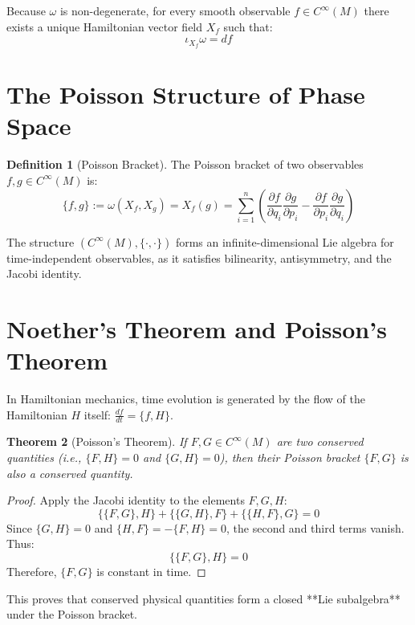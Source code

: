\documentclass[11pt,a4paper,oneside]{book}
\theoremstyle{definition}
\newtheorem{definition}{Definition}[chapter]
\theoremstyle{plain}
\newtheorem{theorem}[definition]{Theorem}
\begin{document}
Because $\omega$ is non-degenerate, for every smooth observable $f \in C^\infty(M)$ there exists a unique Hamiltonian vector field $X_f$ such that:
\begin{equation}
\iota_{X_f} \omega = d f
\end{equation}

\section{The Poisson Structure of Phase Space}
\begin{definition}[Poisson Bracket]
The Poisson bracket of two observables $f, g \in C^\infty(M)$ is:
\begin{equation}
\{f, g\} := \omega(X_f, X_g) = X_f(g) = \sum_{i=1}^n \left( \frac{\partial f}{\partial q_i} \frac{\partial g}{\partial p_i} - \frac{\partial f}{\partial p_i} \frac{\partial g}{\partial q_i} \right)
\end{equation}
\end{definition}

The structure $(C^\infty(M), \{\cdot, \cdot\})$ forms an infinite-dimensional Lie algebra for time-independent observables, as it satisfies bilinearity, antisymmetry, and the Jacobi identity.

\section{Noether's Theorem and Poisson's Theorem}
In Hamiltonian mechanics, time evolution is generated by the flow of the Hamiltonian $H$ itself: $\frac{df}{dt} = \{f, H\}$.

\begin{theorem}[Poisson's Theorem]
If $F, G \in C^\infty(M)$ are two conserved quantities (i.e., $\{F, H\} = 0$ and $\{G, H\} = 0$), then their Poisson bracket $\{F, G\}$ is also a conserved quantity.
\end{theorem}

\begin{proof}
Apply the Jacobi identity to the elements $F, G, H$:
\[ \{\{F, G\}, H\} + \{\{G, H\}, F\} + \{\{H, F\}, G\} = 0 \]
Since $\{G, H\} = 0$ and $\{H, F\} = -\{F, H\} = 0$, the second and third terms vanish. Thus:
\[ \{\{F, G\}, H\} = 0 \]
Therefore, $\{F, G\}$ is constant in time.
\end{proof}

This proves that conserved physical quantities form a closed **Lie subalgebra** under the Poisson bracket.
\end{document}

